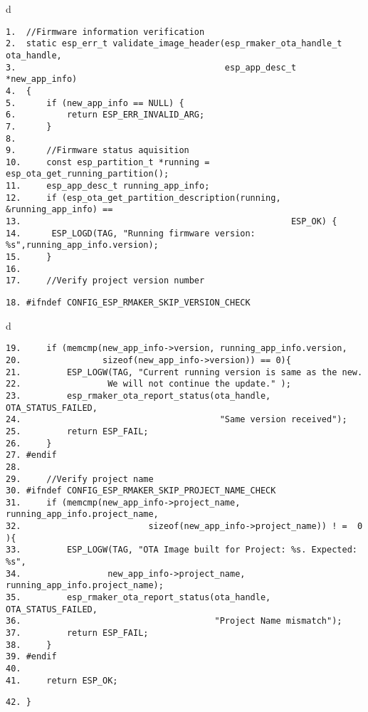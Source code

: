 \documentclass[a4paper,12pt]{book}
\begin{document}
\begin{codebloc}
\begin{tabular}{d}
\vspace{2pt}
\begin{verbatim}
1.  //Firmware information verification
2.  static esp_err_t validate_image_header(esp_rmaker_ota_handle_t ota_handle,
3.                                         esp_app_desc_t *new_app_info)
4.  {
5.      if (new_app_info == NULL) {
6.          return ESP_ERR_INVALID_ARG;
7.      }
8.
9.      //Firmware status aquisition
10.     const esp_partition_t *running = esp_ota_get_running_partition();
11.     esp_app_desc_t running_app_info;
12.     if (esp_ota_get_partition_description(running, &running_app_info) ==
13.                                                     ESP_OK) {
14.      ESP_LOGD(TAG, "Running firmware version: %s",running_app_info.version);
15.     }
16.
17.     //Verify project version number
\end{verbatim}
\verb|18. #ifndef CONFIG_ESP_RMAKER_SKIP_VERSION_CHECK|
\end{tabular}
\end{codebloc}

\begin{codebloc}
\begin{tabular}{d}
\vspace{2pt}
\begin{verbatim}
19.     if (memcmp(new_app_info->version, running_app_info.version,
20.                sizeof(new_app_info->version)) == 0){
21.         ESP_LOGW(TAG, "Current running version is same as the new.
22.                 We will not continue the update." );
23.         esp_rmaker_ota_report_status(ota_handle, OTA_STATUS_FAILED,
24.                                       "Same version received");
25.         return ESP_FAIL;
26.     }
27. #endif
28.
29.     //Verify project name
30. #ifndef CONFIG_ESP_RMAKER_SKIP_PROJECT_NAME_CHECK
31.     if (memcmp(new_app_info->project_name, running_app_info.project_name,
32.                         sizeof(new_app_info->project_name)) ! =  0 ){
33.         ESP_LOGW(TAG, "OTA Image built for Project: %s. Expected: %s",
34.                 new_app_info->project_name, running_app_info.project_name);
35.         esp_rmaker_ota_report_status(ota_handle, OTA_STATUS_FAILED,
36.                                      "Project Name mismatch");
37.         return ESP_FAIL;
38.     }
39. #endif
40.
41.     return ESP_OK;
\end{verbatim}
\verb|42. }|
\end{tabular}
\end{codebloc}
\end{document}
